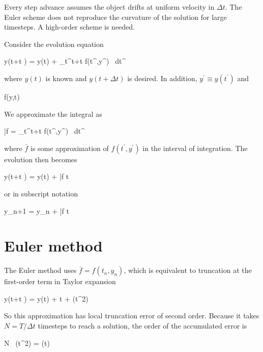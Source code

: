 Every step advance assumes the object drifts at uniform velocity in
$\Delta t$. The Euler scheme does not reproduce the curvature of the solution for
large timesteps. A high-order scheme is needed. 

Consider the evolution equation 

\beq
y(t+\Delta t ) = y(t) + \int_t^{t+\Delta t} f(t^\prime,y^\prime) \ dt^\prime 
\label{eq:evolution}
\eeq

\noindent where $y(t)$ is known and $y(t+\Delta t)$ is desired. In
addition, $y^\prime \equiv y(t^\prime)$ and 

\beq
f(y,t) \equiv {}
\label{eq:function}
\eeq


We approximate the integral as 

\beq
\bar{f} = \int_t^{t+\Delta t} f(t^\prime,y^\prime) \ dt^\prime
\label{eq:bar}
\eeq


\noindent where $\bar{f}$ is some approximation of $f(t^\prime,y^\prime)$ in the interval of
integration. The evolution then becomes 

\beq
y(t+\Delta t ) = y(t) + \bar{f} \Delta t 
\eeq

\noindent or in subscript notation 

\beq
y_{n+1} = y_n + \bar{f} \Delta t 
\eeq

\section{Euler method}

The Euler method uses $\bar{f} = f(t_n,y_n)$, which is equivalent to
truncation at the first-order term in Taylor expansion 

\beq
y(t+\Delta t ) = y(t) +  \Delta t + (\Delta t^2)
\eeq

So this approximation has local truncation error of second order. Because it takes $N=T/\Delta t$ timesteps to reach a
solution, the order of the accumulated error is 

\beq
N \ (\Delta t^2)  = (\Delta t)
\eeq

